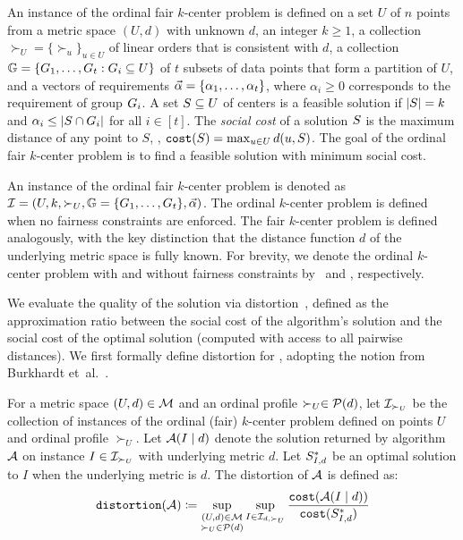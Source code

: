 \documentclass{article}
\begin{document}
\begin{definition}
\label{def:ordinal-fair-k-center-with-limited-distance-queries}
An instance of the ordinal fair $k$-center problem is defined on a set $U$ of $n$ points from a metric space $(U,d)$ with unknown $d$, an integer $k \geq  1$, a collection $\succ_U=\{\succ_u\}_{u \in U}$ of linear orders that is  consistent with $d$, a collection $\mathbb{G}= \{G_1, \dots, G_t : G_i \subseteq U\}$ of $t$ subsets of data points 
that form a partition of $U$,
and a vectors of requirements $\vec{\alpha} = \{\alpha_1,\dots,\alpha_t\}$, where $\alpha_i \ge 0$ corresponds to the requirement of group $G_i$. A set $S \subseteq U$ of centers is a feasible solution if $|S| = k$ and $\alpha_i \leq |S \cap G_i|$ for all $i \in [t]$. 
The \emph{social cost} of a solution $S$ is the maximum distance of any point to $S$, \ie, $\texttt{cost}(S) = \max_{u \in U} d(u,S)$. The goal of the ordinal fair $k$-center problem is to find a feasible solution with minimum social cost.
\end{definition}


An instance of the ordinal fair $k$-center problem is denoted as $\mathcal{I} = (U,k, \succ_U, \mathbb{G}=\{G_1,\dots,G_t\},\vec{\alpha})$.
The ordinal $k$-center problem is defined when no fairness constraints are enforced.
The fair $k$-center problem is defined analogously, with the key distinction that the distance function $d$ of the underlying metric space is fully known.  
For brevity, we denote the ordinal $k$-center problem with and without fairness constraints by \ordfairkcen\ and \ordkcen, respectively.

We evaluate the quality of the solution via distortion~\cite{procaccia2006distortion}, defined as the approximation ratio between the social cost of the algorithm's solution 
and the social cost of the optimal solution (computed with access to all pairwise distances).
We first formally define distortion for \ordfairkcen, adopting the notion from Burkhardt et~al.~\cite{burkhardt2024low}.




\begin{definition}
    For a metric space $(U,d) \in \mathcal{M}$ and an ordinal profile $\succ_U \in \mathcal{P}(d)$, let $\mathcal{I}_{\succ_U}$ be the collection of instances of the ordinal (fair) $k$-center problem defined on points $U$ and ordinal profile $\succ_U$. 
    Let $\mathcal{A}(I \mid d)$ denote the solution returned by algorithm $\mathcal{A}$ on instance $I \in \mathcal{I}_{\succ_U}$ with underlying metric $d$. 
    Let $S^*_{I, d}$ be an optimal solution to $I$ when the underlying metric is $d$.
    The distortion of $\mathcal{A}$ is defined as:
    \[
    \texttt{dis\-tor\-tion}(\mathcal{A})\coloneqq \sup_{\substack{(U,d) \in \mathcal{M} \\ \succ_U \in \mathcal{P}(d)}} \sup_{I \in \mathcal{I}_{d,\succ_U}}  \frac{\texttt{cost}(\mathcal{A}(I \mid d))}{\texttt{cost}(S^*_{I,d})}
    \]
\end{definition}
\end{document}
